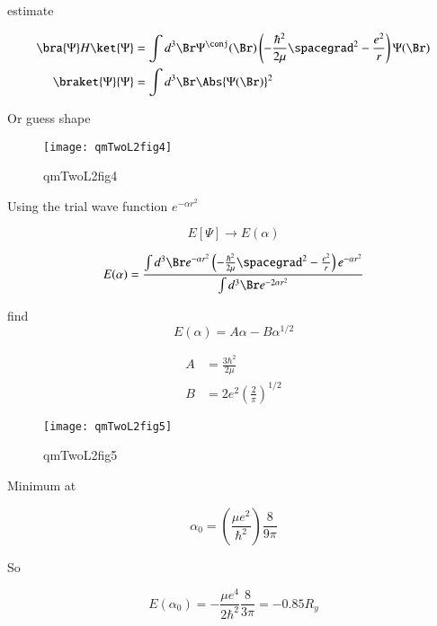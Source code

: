 estimate

\begin{align}\label{eqn:qmTwoL2:350}
\bra{\Psi} H \ket{\Psi} &= \int d^3 \Br \Psi^\conj(\Br) \left( -\frac{\hbar^2}{2 \mu} \spacegrad^2 - \frac{e^2}{r} \right) \Psi(\Br) \\
\braket{\Psi}{\Psi} &= \int d^3 \Br \Abs{\Psi(\Br)}^2
\end{align}

Or guess shape

\begin{figure}[htp]
\centering
\texttt{[image: qmTwoL2fig4]}
\caption{qmTwoL2fig4}\label{fig:qmTwoL2fig4}
\end{figure}

Using the trial wave function $e^{-\alpha r^2}$

\begin{equation}\label{eqn:qmTwoL2:370}
E[\Psi] \rightarrow E(\alpha)
\end{equation}

\begin{equation}\label{eqn:qmTwoL2:390}
E(\alpha) =
\frac{\int d^3 \Br e^{-\alpha r^2} \left( -\frac{\hbar^2}{2 \mu} \spacegrad^2 - \frac{e^2}{r} \right) e^{-\alpha r^2}}{
\int d^3\Br e^{-2 \alpha r^2}
}
\end{equation}

find
\begin{equation}\label{eqn:qmTwoL2:410}
E(\alpha) = A \alpha - B \alpha^{1/2}
\end{equation}

\begin{align}\label{eqn:qmTwoL2:430}
A &= \frac{3 \hbar^2}{2\mu} \\
B &= 2 e^2 \left( \frac{2}{\pi} \right)^{1/2}
\end{align}

\begin{figure}[htp]
\centering
\texttt{[image: qmTwoL2fig5]}
\caption{qmTwoL2fig5}\label{fig:qmTwoL2fig5}
\end{figure}

Minimum at

\begin{equation}\label{eqn:qmTwoL2:450}
\alpha_0 =
\left( \frac{\mu e^2}{ \hbar^2 } \right) \frac{8 }{9 \pi}
\end{equation}

So

\begin{equation}\label{eqn:qmTwoL2:470}
E(\alpha_0) =
- \frac{\mu e^4 }{2 \hbar^2} \frac{8 }{3 \pi} = -0.85 R_y
\end{equation}

